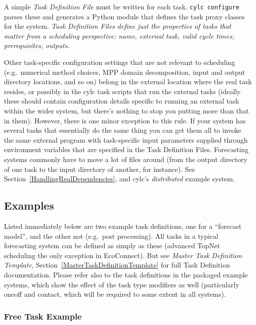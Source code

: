 \documentclass[11pt,a4paper]{article}
\begin{document}
A simple {\em Task Definition File} must be written for each task.
\lstinline=cylc configure= parses these and generates a Python module
that defines the task proxy classes for the system. {\em Task
Definition Files define just the properties of tasks that matter from a
scheduling perspective: name, external task, valid cycle times,
prerequisites, outputs.} 

Other task-specific configuration settings that are not relevant to
scheduling (e.g.\ numerical method choices, MPP
domain decomposition, input and output directory locations, and so on)
belong in the external location where the real task resides, or possibly
in the cylc task scripts that run the external tasks (ideally these
should contain configuration details specific to running an external
task within the wider system, but there's nothing to stop you putting
more than that in them). However, there is one minor exception to this
rule. If your system has several tasks that essentially do the same
thing you can get them all to invoke the same external program with
task-specific input parameters supplied through environment variables
that are specified in the Task Definition Files. Forecasting systems
commonly have to move a lot of files around (from the output
directory of one task to the input directory of another, for
instance). See Section~\ref{HandlingRealDependencies}, and cylc's
{\em distributed} example system. 

\subsection{Examples}

Listed immediately below are two example task definitions, one for a
``forecast model'', and the other not (e.g.\ post processing). All tasks
in a typical forecasting system can be defined as simply as these
(advanced TopNet scheduling the only exception in EcoConnect). 
But see {\em Master Task Definition Template},
Section~\ref{MasterTaskDefinitionTemplate} for full Task Definition
documentation. Please refer also to the task definitions in the packaged
example systems, which show the effect of the task type modifiers as well
(particularly oneoff and contact, which will be required to some extent
in all systems).


\pagebreak
\subsubsection{Free Task Example}
\end{document}
